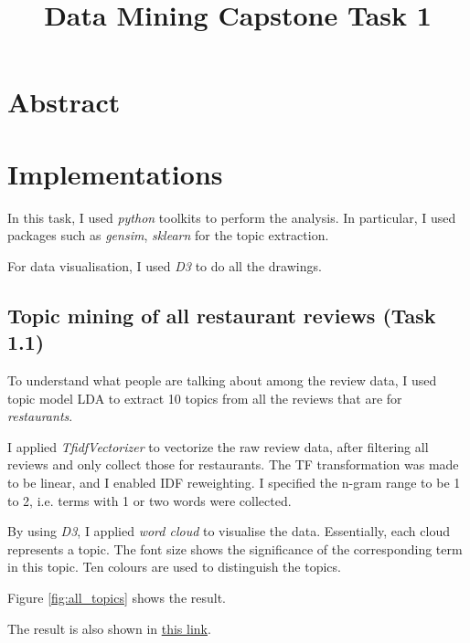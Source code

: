 \documentclass[11pt]{article}
\title{Data Mining Capstone Task 1}
\begin{document}
\maketitle

\section{Abstract}

\section{Implementations}
In this task, I used \emph{python} toolkits to perform the analysis.
In particular, I used packages such as \emph{gensim}, \emph{sklearn} for the topic extraction.

For data visualisation, I used \emph{D3} to do all the drawings.

\subsection{Topic mining of all restaurant reviews (Task 1.1)}
To understand what people are talking about among the review data, I used topic model LDA to extract 10 topics from all the reviews that are for \emph{restaurants}.

I applied \emph{TfidfVectorizer} to vectorize the raw review data, after filtering all reviews and only collect those for restaurants.
The TF transformation was made to be linear, and I enabled IDF reweighting.
I specified the n-gram range to be 1 to 2, i.e. terms with 1 or two words were collected.

By using \emph{D3}, I applied \emph{word cloud} to visualise the data.
Essentially, each cloud represents a topic. The font size shows the significance of the corresponding term in this topic.
Ten colours are used to distinguish the topics.

Figure \ref{fig:all_topics} shows the result.

The result is also shown in \href{http://jiacheng-pan.me/standalone/datamining_capstone/task1/all_reviews_topics.html}{this link}.
\end{document}
